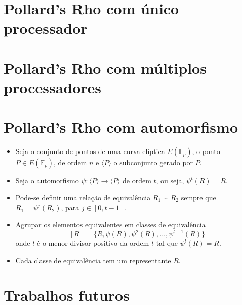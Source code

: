 \documentclass{beamer}
\begin{document}
%
%

\section{Pollard's Rho com único processador}
\begin{frame}

\end{frame}

%
%

\section{Pollard's Rho com múltiplos processadores}
\begin{frame}

\end{frame}

%
%

\section{Pollard's Rho com automorfismo}
\begin{frame}
  \begin{itemize}
    \item Seja o conjunto de pontos de uma curva elíptica $E(\mathbb{F}_p)$, o ponto $P \in E(\mathbb{F}_p)$, de ordem $n$ e $\langle P \rangle$ o subconjunto gerado por $P$.
    \item Seja o automorfismo $\psi: \langle P \rangle \to \langle P \rangle$ de ordem $t$, ou seja, $\psi^t(R) = R$.
    \item Pode-se definir uma relação de equivalência $R_1 \sim R_2$ sempre que $R_1 = \psi^j(R_2)$, para $j \in [0, t-1]$.
    \item Agrupar os elementos equivalentes em classes de equivalência
    $$
      [R] = \{R, \psi(R), \psi^2(R), \dots, \psi^{l-1}(R)\}
    $$
    onde $l$ é o menor divisor positivo da ordem $t$ tal que $\psi^l(R) = R$.
    \item Cada classe de equivalência tem um representante $\overline{R}$.
  \end{itemize}
\end{frame}

%
%

\section{Trabalhos futuros}
\begin{frame}

\end{frame}
\end{document}
